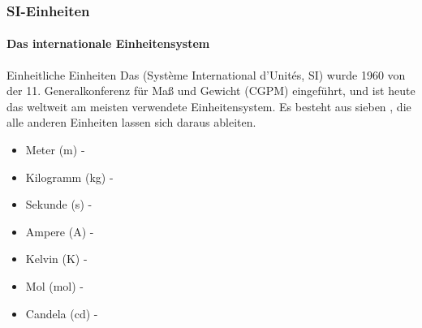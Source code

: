 \begin{frame}
  \frametitle{SI-Einheiten}
  \framesubtitle{Das internationale Einheitensystem}
    \pause
    \begin{block}{Einheitliche Einheiten}
    Das  (Système International
    d'Unités, SI) wurde 1960 von der 11. Generalkonferenz für Maß und Gewicht
    (CGPM) eingeführt, und ist heute das weltweit am meisten verwendete
    Einheitensystem. Es besteht aus sieben , die
    alle anderen Einheiten lassen sich daraus ableiten.
    \pause
    \begin{itemize}
      \item <+-> Meter (m) - 
      \item <+-> Kilogramm (kg) - 
      \item <+-> Sekunde (s) - 
      \item <+-> Ampere (A) - 
      \item <+-> Kelvin (K) - 
      \item <+-> Mol (mol) - 
      \item <+-> Candela (cd) - 
    \end{itemize}
  \end{block} 
  \parbox[t]{0.2\linewidth}{
  }\parbox[t]{0.69\linewidth}{
  }
\end{frame}

